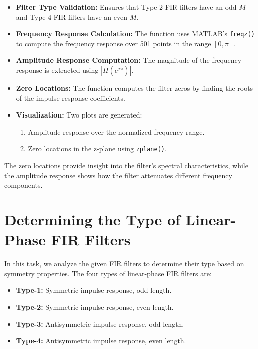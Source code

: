 \documentclass[a4paper,12pt]{article}
\begin{document}
\begin{itemize}
    \item \textbf{Filter Type Validation:} Ensures that Type-2 FIR filters have an odd \( M \) and Type-4 FIR filters have an even \( M \).
    
    \item \textbf{Frequency Response Calculation:} The function uses MATLAB's \texttt{freqz()} to compute the frequency response over 501 points in the range \( [0, \pi] \).
    
    \item \textbf{Amplitude Response Computation:} The magnitude of the frequency response is extracted using \( |H(e^{j\omega})| \).
    
    \item \textbf{Zero Locations:} The function computes the filter zeros by finding the roots of the impulse response coefficients.
    
    \item \textbf{Visualization:} Two plots are generated:
        \begin{enumerate}
            \item Amplitude response over the normalized frequency range.
            \item Zero locations in the z-plane using \texttt{zplane()}.
        \end{enumerate}
\end{itemize}

The zero locations provide insight into the filter’s spectral characteristics, while the amplitude response shows how the filter attenuates different frequency components.
\section{Determining the Type of Linear-Phase FIR Filters}

In this task, we analyze the given FIR filters to determine their type based on symmetry properties. The four types of linear-phase FIR filters are:

\begin{itemize}
    \item \textbf{Type-1:} Symmetric impulse response, odd length.
    \item \textbf{Type-2:} Symmetric impulse response, even length.
    \item \textbf{Type-3:} Antisymmetric impulse response, odd length.
    \item \textbf{Type-4:} Antisymmetric impulse response, even length.
\end{itemize}
\end{document}
